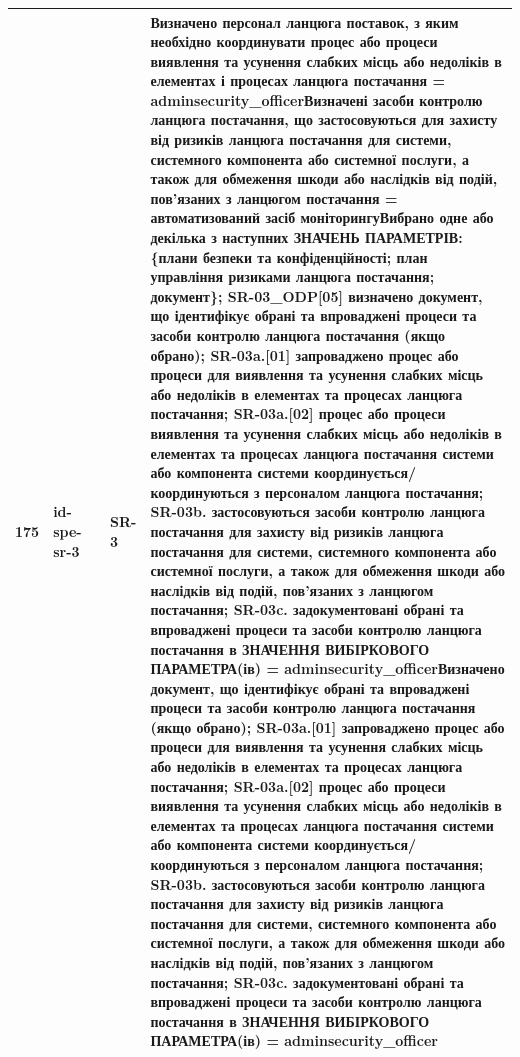 \documentclass[10pt]{article}
\begin{document}
\begin{longtable}{|c|>{\raggedright\arraybackslash}p{4cm}|>{\raggedright\arraybackslash}p{2.5cm}|>{\raggedright\arraybackslash}p{3.5cm}|>{\raggedright\arraybackslash}p{5.5cm}|}
175 & id-spe-sr-3 &  & SR-3 & Визначено персонал ланцюга поставок, з яким необхідно координувати процес або процеси виявлення та усунення слабких місць або недоліків в елементах і процесах ланцюга постачання = \textbf{adminsecurity\_\allowbreak{}officer}\newline Визначені засоби контролю ланцюга постачання, що застосовуються для захисту від ризиків ланцюга постачання для системи, системного компонента або системної послуги, а також для обмеження шкоди або наслідків від подій, пов'язаних з ланцюгом постачання = \textbf{автоматизований засіб моніторингу}\newline Вибрано одне або декілька з наступних ЗНАЧЕНЬ ПАРАМЕТРІВ: \{плани безпеки та конфіденційності; план управління ризиками ланцюга постачання; документ\}; SR-03\_\allowbreak{}ODP[05] визначено документ, що ідентифікує обрані та впроваджені процеси та засоби контролю ланцюга постачання (якщо обрано); SR-03a.[01] запроваджено процес або процеси для виявлення та усунення слабких місць або недоліків в елементах та процесах ланцюга постачання; SR-03a.[02] процес або процеси виявлення та усунення слабких місць або недоліків в елементах та процесах ланцюга постачання системи або компонента системи координується/координуються з персоналом ланцюга постачання; SR-03b. застосовуються засоби контролю ланцюга постачання для захисту від ризиків ланцюга постачання для системи, системного компонента або системної послуги, а також для обмеження шкоди або наслідків від подій, пов'язаних з ланцюгом постачання; SR-03c. задокументовані обрані та впроваджені процеси та засоби контролю ланцюга постачання в ЗНАЧЕННЯ ВИБІРКОВОГО ПАРАМЕТРА(ів) = \textbf{adminsecurity\_\allowbreak{}officer}\newline Визначено документ, що ідентифікує обрані та впроваджені процеси та засоби контролю ланцюга постачання (якщо обрано); SR-03a.[01] запроваджено процес або процеси для виявлення та усунення слабких місць або недоліків в елементах та процесах ланцюга постачання; SR-03a.[02] процес або процеси виявлення та усунення слабких місць або недоліків в елементах та процесах ланцюга постачання системи або компонента системи координується/координуються з персоналом ланцюга постачання; SR-03b. застосовуються засоби контролю ланцюга постачання для захисту від ризиків ланцюга постачання для системи, системного компонента або системної послуги, а також для обмеження шкоди або наслідків від подій, пов'язаних з ланцюгом постачання; SR-03c. задокументовані обрані та впроваджені процеси та засоби контролю ланцюга постачання в ЗНАЧЕННЯ ВИБІРКОВОГО ПАРАМЕТРА(ів) = \textbf{adminsecurity\_\allowbreak{}officer} \\ \hline

\end{longtable}
\end{document}
